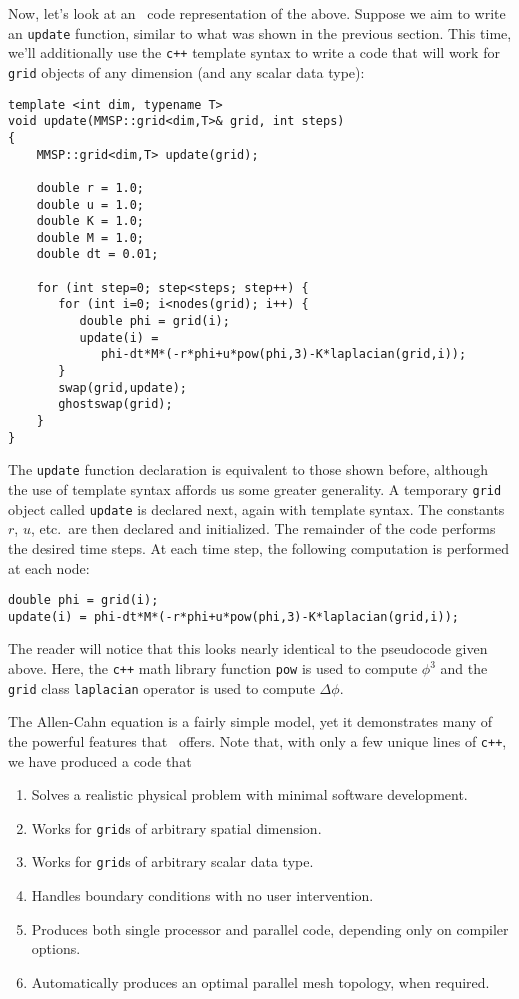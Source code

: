 Now, let's look at an \MMSP\ code representation of the above.  Suppose we aim to write an {\tt update} function, similar to what was shown in the previous section.  This time, we'll additionally use the {\tt c++} template syntax to write a code that will work for {\tt grid} objects of any dimension (and any scalar data type):
\begin{shadebox}
\begin{verbatim}
template <int dim, typename T>
void update(MMSP::grid<dim,T>& grid, int steps)
{
    MMSP::grid<dim,T> update(grid);

    double r = 1.0;
    double u = 1.0;
    double K = 1.0;
    double M = 1.0;
    double dt = 0.01;

    for (int step=0; step<steps; step++) {
       for (int i=0; i<nodes(grid); i++) {
          double phi = grid(i);
          update(i) =
             phi-dt*M*(-r*phi+u*pow(phi,3)-K*laplacian(grid,i));
       }
       swap(grid,update);
       ghostswap(grid);
    }
}
\end{verbatim}
\end{shadebox}
The {\tt update} function declaration is equivalent to those shown before, although the use of template syntax affords us some greater generality.  A temporary {\tt grid} object called {\tt update} is declared next, again with template syntax.  The constants $r$, $u$, etc.\ are then declared and initialized.  The remainder of the code performs the desired time steps.  At each time step, the following computation is performed at each node:
\begin{shadebox}
\begin{verbatim}
double phi = grid(i);
update(i) = phi-dt*M*(-r*phi+u*pow(phi,3)-K*laplacian(grid,i));
\end{verbatim}
\end{shadebox}
The reader will notice that this looks nearly identical to the pseudocode given above.  Here, the {\tt c++} math library function {\tt pow} is used to compute $\phi^3$ and the {\tt grid} class {\tt laplacian} operator is used to compute $\Delta \phi$.

The Allen-Cahn equation is a fairly simple model, yet it demonstrates many of the powerful features that \MMSP\ offers.  Note that, with only a few unique lines of {\tt c++}, we have produced a code that
\begin{enumerate}
\item{Solves a realistic physical problem with minimal software development.}
\item{Works for {\tt grid}s of arbitrary spatial dimension.}
\item{Works for {\tt grid}s of arbitrary scalar data type.}
\item{Handles boundary conditions with no user intervention.}
\item{Produces both single processor and parallel code, depending only on compiler options.}
\item{Automatically produces an optimal parallel mesh topology, when required.}
\end{enumerate}


